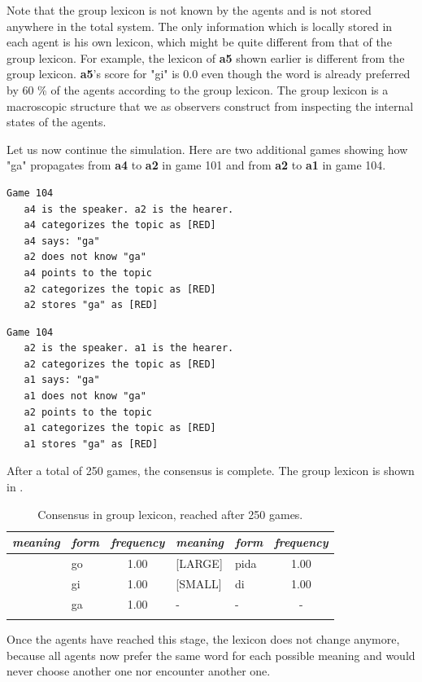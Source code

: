 Note that the group lexicon is not known by the agents
and is not stored anywhere in the 
total system. The only information which is locally stored in each 
agent is his own lexicon, which might be quite different from that 
of the group lexicon. For example, the lexicon of {\bf a5} shown earlier
is different from the group lexicon.
{\bf a5}'s score for "gi" is 0.0
even though the word is already preferred by 60 \% of 
the agents according to the group lexicon. 
The group lexicon is a macroscopic structure that we
as observers construct from inspecting the internal 
states of the agents. 

Let us now continue the simulation. Here are two additional
games showing how "ga" propagates from {\bf a4} to {\bf a2} in 
game 101 and from {\bf a2} to {\bf a1} in game 104. 
\begin{verbatim}
Game 104
   a4 is the speaker. a2 is the hearer. 
   a4 categorizes the topic as [RED]
   a4 says: "ga"
   a2 does not know "ga"
   a4 points to the topic
   a2 categorizes the topic as [RED]
   a2 stores "ga" as [RED]
\end{verbatim}
\begin{verbatim}
Game 104
   a2 is the speaker. a1 is the hearer. 
   a2 categorizes the topic as [RED]
   a1 says: "ga"
   a1 does not know "ga"
   a2 points to the topic
   a1 categorizes the topic as [RED]
   a1 stores "ga" as [RED]
\end{verbatim}
After a total of 250 games, the consensus is complete. 
The group lexicon is shown in . 
\begin{table}
\begin{center}
\begin{tabular}{l  l  c  l  l  c } \midrule 
{\it meaning} & {\it form} & {\it frequency} & {\it meaning} & {\it form} & {\it frequency}\\ \midrule 
[DARK]& go & 1.00 & [LARGE]& pida & 1.00 \\ \midrule 
[LIGHT]& gi & 1.00 & [SMALL]& di & 1.00 \\ \midrule 
[RED]& ga & 1.00 & - & - & -  \\ \midrule 
\lspbottomrule
\end{tabular}
\caption{\label{tab:t-mem5} Consensus in group lexicon, reached after 250 games.}
\end{center}
\end{table}
Once the agents have reached this stage, the lexicon does not 
change anymore, because all agents now prefer the same word for 
each possible meaning and would never choose another one
nor encounter another one. 

